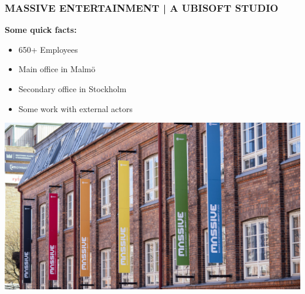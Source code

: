 \documentclass[xcolor=svgnames,10pt,aspectratio=1610]{beamer}
\begin{document}
\begin{frame}
  \frametitle{MASSIVE ENTERTAINMENT | A UBISOFT STUDIO}
  \begin{minipage}{.49\textwidth}
    \textbf{Some quick facts:}
    \begin{itemize}
      \item{650+ Employees}
      \item{Main office in Malmö}
      \item{Secondary office in Stockholm}
      \item{Some work with external actors}
    \end{itemize}
  \end{minipage}
  \begin{minipage}{.49\textwidth}
    \includegraphics{img/massive_outside.jpg}
  \end{minipage}
\end{frame}
\end{document}
